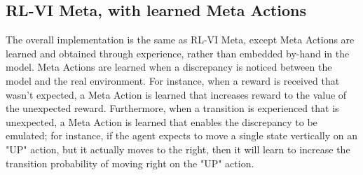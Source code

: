 \subsection{RL-VI Meta, with learned Meta Actions}
The overall implementation is the same as RL-VI Meta, except Meta Actions are learned and obtained through experience, rather than embedded by-hand in the model. Meta Actions are learned when a discrepancy is noticed between the model and the real environment. For instance, when a reward is received that wasn't expected, a Meta Action is learned that increases reward to the value of the unexpected reward. Furthermore, when a transition is experienced that is unexpected, a Meta Action is learned that enables the discrepancy to be emulated; for instance, if the agent expects to move a single state vertically on an "UP" action, but it actually moves to the right, then it will learn to increase the transition probability of moving right on the "UP" action.




